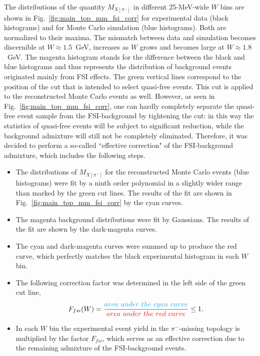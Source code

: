 The distributions of the quantity $M_{X[\pi^{-}]}$ in different 25-MeV-wide $W$ bins are shown in Fig.~\ref{fig:main_top_mm_fsi_corr} for experimental data (black histograms) and for Monte Carlo simulation (blue histograms). Both are normalized to their maxima. The mismatch between data and simulation becomes discernible at $W\approx 1.5$~GeV, increases as $W$ grows and becomes large at $W\approx 1.8$~GeV. The magenta histogram stands for the difference between the black and blue histograms and thus represents the distribution of background events originated mainly from FSI effects. The green vertical lines correspond to the position of the cut that is intended to select quasi-free events. This cut is applied to the reconstructed Monte Carlo events as well. However, as seen in Fig.~\ref{fig:main_top_mm_fsi_corr}, one can hardly completely separate the quasi-free event sample from the FSI-background by tightening the cut: in this way the statistics of quasi-free events will be subject to significant reduction, while the background admixture will still not be completely eliminated. Therefore, it was decided to perform a so-called ``effective correction" of the FSI-background admixture, which includes the following steps.

\begin{itemize}
\item The distributions of $M_{X[\pi^{-}]}$ for the reconstructed Monte Carlo events (blue histograms) were fit by a ninth order polynomial in a slightly wider range than marked by the green cut lines. The results of the fit are shown in Fig.~\ref{fig:main_top_mm_fsi_corr} by the cyan curves.
\item The magenta background distributions were fit by Gaussians. The results of the fit are shown by the dark-magenta curves.
\item The cyan and dark-magenta curves were summed up to produce the red curve, which perfectly matches the black experimental histogram in each $W$ bin.
\item The following correction factor was determined in the left side of the green cut line,
\begin{equation}
 F_{fsi}(W) = \frac{\color{cyan}{area~under~the~cyan~curve}}{\color{red}{area~under~the~red~curve}} \leq 1.\label{eq:fsi_corr_fact}
\end{equation}\label{eq:fsi_corr}\vspace{-1em}
\item In each $W$ bin the experimental event yield in the $\pi^{-}$-missing topology is multiplied by the factor $F_{fsi}$, which serves as an effective correction due to the remaining admixture of the FSI-background events.
\end{itemize}


